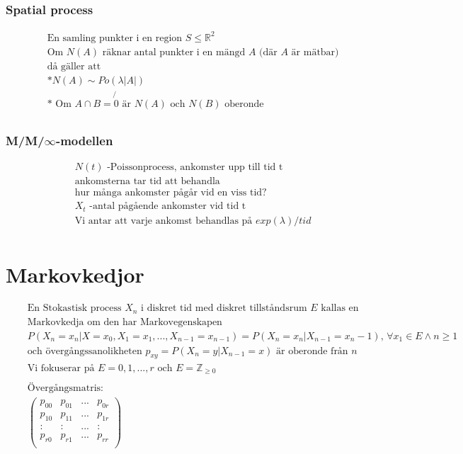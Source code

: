 \subsubsection{Spatial process}
\begin{align*}
  &\quad  \text{En samling punkter i en region $S\leq\mathbb{R}^2$} \\
  &\quad  \text{Om $N(A)$ räknar antal punkter i en mängd $A$ (där $A$ är mätbar)} \\
  &\quad  \text{då gäller att} \\
  &\quad  \text{*} N(A)\sim Po(\lambda|A|) \\
  &\quad  \text{* Om $A\cap{B}=\not{0}$ är $N(A)$ och $N(B)$ oberonde} \\
\end{align*}

\subsubsection{M/M/$\infty$-modellen}
\begin{align*}
  &\quad  N(t) \text{ -Poissonprocess, ankomster upp till tid t} \\
  &\quad  \text{ankomsterna tar tid att behandla} \\
  &\quad  \text{hur många ankomster pågår vid en viss tid?} \\
  &\quad  X_t \text{ -antal pågående ankomster vid tid t} \\
  &\quad  \text{Vi antar att varje ankomst behandlas på $exp(\lambda)/tid$} \\
\end{align*}

\section{Markovkedjor}
\begin{align*}
  &\quad  \text{En Stokastisk process ${X_n}$ i diskret tid med diskret tillståndsrum $E$ kallas en} \\
  &\quad  \text{Markovkedja om den har Markovegenskapen} \\
  &\quad  P(X_n=x_n|X=x_0,X_1=x_1,...,X_{n-1}=x_{n-1}) = P(X_n=x_n|X_{n-1}=x_n-1), \,
  \forall x_1\in{E} \land n\geq1 \\
  &\quad  \text{och övergångssanolikheten } p_{xy}=P(X_n=y|X_{n-1}=x) \text{ är oberonde från $n$} \\
  &\quad  \text{Vi fokuserar på } E={0,1,...,r} \text{ och } E=\mathbb{Z}_{\geq0} \\
  &\quad   \\
  &\quad  \text{Övergångsmatris:} \\
  &\quad
  \left(\begin{array}{cccc}
    p_{00} & p_{01} & ... & p_{0r} \\
    p_{10} & p_{11} & ... & p_{1r} \\
    : & : & ... & : \\
    p_{r0} & p_{r1} & ... & p_{rr} \\
  \end{array}\right) \\
\end{align*}

